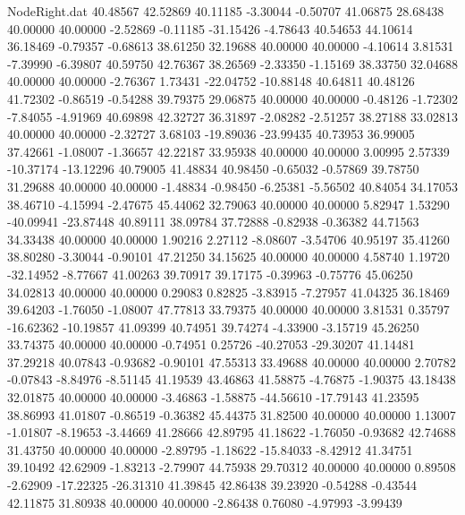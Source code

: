 \begin{filecontents}{NodeRight.dat}
  40.48567   42.52869   40.11185    -3.30044   -0.50707   41.06875   28.68438   40.00000   40.00000   -2.52869   -0.11185  -31.15426   -4.78643
  40.54653   44.10614   36.18469    -0.79357   -0.68613   38.61250   32.19688   40.00000   40.00000   -4.10614    3.81531   -7.39990   -6.39807
  40.59750   42.76367   38.26569    -2.33350   -1.15169   38.33750   32.04688   40.00000   40.00000   -2.76367    1.73431  -22.04752  -10.88148
  40.64811   40.48126   41.72302    -0.86519   -0.54288   39.79375   29.06875   40.00000   40.00000   -0.48126   -1.72302   -7.84055   -4.91969
  40.69898   42.32727   36.31897    -2.08282   -2.51257   38.27188   33.02813   40.00000   40.00000   -2.32727    3.68103  -19.89036  -23.99435
  40.73953   36.99005   37.42661    -1.08007   -1.36657   42.22187   33.95938   40.00000   40.00000    3.00995    2.57339  -10.37174  -13.12296
  40.79005   41.48834   40.98450    -0.65032   -0.57869   39.78750   31.29688   40.00000   40.00000   -1.48834   -0.98450   -6.25381   -5.56502
  40.84054   34.17053   38.46710    -4.15994   -2.47675   45.44062   32.79063   40.00000   40.00000    5.82947    1.53290  -40.09941  -23.87448
  40.89111   38.09784   37.72888    -0.82938   -0.36382   44.71563   34.33438   40.00000   40.00000    1.90216    2.27112   -8.08607   -3.54706
  40.95197   35.41260   38.80280    -3.30044   -0.90101   47.21250   34.15625   40.00000   40.00000    4.58740    1.19720  -32.14952   -8.77667
  41.00263   39.70917   39.17175    -0.39963   -0.75776   45.06250   34.02813   40.00000   40.00000    0.29083    0.82825   -3.83915   -7.27957
  41.04325   36.18469   39.64203    -1.76050   -1.08007   47.77813   33.79375   40.00000   40.00000    3.81531    0.35797  -16.62362  -10.19857
  41.09399   40.74951   39.74274    -4.33900   -3.15719   45.26250   33.74375   40.00000   40.00000   -0.74951    0.25726  -40.27053  -29.30207
  41.14481   37.29218   40.07843    -0.93682   -0.90101   47.55313   33.49688   40.00000   40.00000    2.70782   -0.07843   -8.84976   -8.51145
  41.19539   43.46863   41.58875    -4.76875   -1.90375   43.18438   32.01875   40.00000   40.00000   -3.46863   -1.58875  -44.56610  -17.79143
  41.23595   38.86993   41.01807    -0.86519   -0.36382   45.44375   31.82500   40.00000   40.00000    1.13007   -1.01807   -8.19653   -3.44669
  41.28666   42.89795   41.18622    -1.76050   -0.93682   42.74688   31.43750   40.00000   40.00000   -2.89795   -1.18622  -15.84033   -8.42912
  41.34751   39.10492   42.62909    -1.83213   -2.79907   44.75938   29.70312   40.00000   40.00000    0.89508   -2.62909  -17.22325  -26.31310
  41.39845   42.86438   39.23920    -0.54288   -0.43544   42.11875   31.80938   40.00000   40.00000   -2.86438    0.76080   -4.97993   -3.99439

\end{filecontents}
